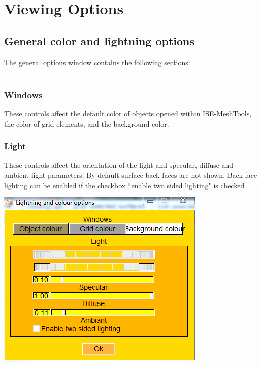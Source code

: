 




\chapter{Viewing Options}
\minitoc  

\section{General color and lightning options}

The general options window contains the following
sections:\\\\
\noindent
\begin{minipage}{0.55\textwidth}
\subsection{Windows}
These controls affect the default color of objects opened within ISE-MeshTools, the color of grid elements, and the background color.
\subsection{Light}
These controls affect the orientation of the light and specular, diffuse and ambient light parameters. By default surface back faces are not shown. Back face lighting can be enabled if the checkbox ``enable two sided lighting" is checked

\end{minipage}  
 \begin{minipage}{0.45\textwidth}\centering
  \includegraphics[scale=0.4]{images/Viewing_options/General_color.png}
 \end{minipage} 
\noindent






